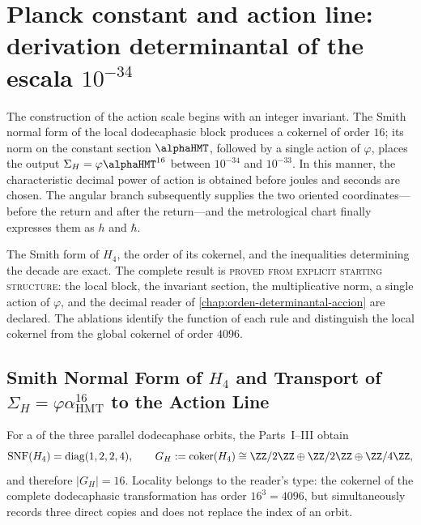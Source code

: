 \section{Planck constant and action line: derivation determinantal of the escala \texorpdfstring{\(10^{-34}\)}{decadica -34}}
\label{chap:escala-accion}

The construction of the action scale begins with an integer invariant. The
Smith normal form of the local dodecaphasic block produces a cokernel of
order \(16\); its norm on the constant section \(\alphaHMT\), followed by
a single action of \(\varphi\), places the output
\(\Sigma_H=\varphi\alphaHMT^{16}\) between \(10^{-34}\) and \(10^{-33}\). In
this manner, the characteristic decimal power of action is obtained before
joules and seconds are chosen. The angular branch subsequently supplies the two
oriented coordinates---before the return and after the return---and the
metrological chart finally expresses them as \(h\) and \(\hbar\).

\begin{exactbox}[title={Governing result: from the local cokernel to the action scale}]
The Smith form of \(H_4\), the order of its cokernel, and the inequalities determining the decade are exact. The complete result is \textsc{proved from explicit starting structure}: the local block, the invariant section, the multiplicative norm, a single action of \(\varphi\), and the decimal reader of \cref{chap:orden-determinantal-accion} are declared. The ablations identify the function of each rule and distinguish the local cokernel from the global cokernel of order \(4096\).
\end{exactbox}

\subsection{Smith Normal Form of \texorpdfstring{\(H_4\)}{H4} and Transport of \texorpdfstring{\(\Sigma_H=\varphi\alpha_{\mathrm{HMT}}^{16}\)}{Sigma H} to the Action Line}

For a of the three parallel dodecaphase orbits, the Parts~I--III obtain
\[
\operatorname{SNF}(H_4)=\operatorname{diag}(1,2,2,4),
\qquad
G_H:=\operatorname{coker}(H_4)
\cong\ZZ/2\ZZ\oplus\ZZ/2\ZZ\oplus\ZZ/4\ZZ,
\]
and therefore \(|G_H|=16\). Locality belongs to the reader's type: the
cokernel of the complete dodecaphasic transformation has order
\(16^3=4096\), but simultaneously records three direct copies and does not
replace the index of an orbit.

